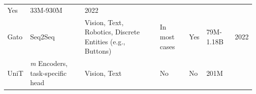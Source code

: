 \documentclass[
]{krantz}
\begin{document}
\begin{longtable}[]{@{}lllllll@{}}
\begin{minipage}[t]{0.12\columnwidth}
Yes\strut
\end{minipage} & \begin{minipage}[t]{0.12\columnwidth}\raggedright
33M-930M\strut
\end{minipage} & \begin{minipage}[t]{0.12\columnwidth}\raggedright
2022\strut
\end{minipage}\tabularnewline
\begin{minipage}[t]{0.12\columnwidth}\raggedright
Gato\strut
\end{minipage} & \begin{minipage}[t]{0.12\columnwidth}\raggedright
Seq2Seq\strut
\end{minipage} & \begin{minipage}[t]{0.12\columnwidth}\raggedright
Vision, Text, Robotics, Discrete Entities (e.g., Buttons)\strut
\end{minipage} & \begin{minipage}[t]{0.12\columnwidth}\raggedright
In most cases\strut
\end{minipage} & \begin{minipage}[t]{0.12\columnwidth}\raggedright
Yes\strut
\end{minipage} & \begin{minipage}[t]{0.12\columnwidth}\raggedright
79M-1.18B\strut
\end{minipage} & \begin{minipage}[t]{0.12\columnwidth}\raggedright
2022\strut
\end{minipage}\tabularnewline
\begin{minipage}[t]{0.12\columnwidth}\raggedright
UniT\strut
\end{minipage} & \begin{minipage}[t]{0.12\columnwidth}\raggedright
\emph{m} Encoders, task-specific head\strut
\end{minipage} & \begin{minipage}[t]{0.12\columnwidth}\raggedright
Vision, Text\strut
\end{minipage} & \begin{minipage}[t]{0.12\columnwidth}\raggedright
No\strut
\end{minipage} & \begin{minipage}[t]{0.12\columnwidth}\raggedright
No\strut
\end{minipage} & \begin{minipage}[t]{0.12\columnwidth}\raggedright
201M\strut
\end{minipage} & \begin{minipage}[t]{0.12\columnwidth}\raggedright

\end{minipage}
\end{longtable}
\end{document}
